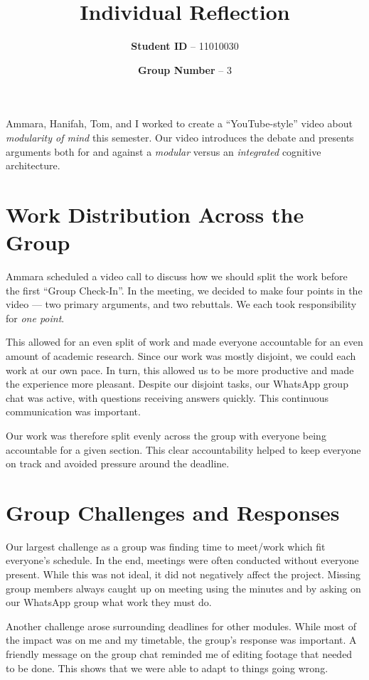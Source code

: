 \documentclass[paper=a4,fontsize=16pt]{article}
\title{Individual Reflection}
\author{\textbf{Student ID} -- 11010030}
\date{\textbf{Group Number} -- 3}
\begin{document}
\maketitle

Ammara, Hanifah, Tom, and I worked to create a
``YouTube-style'' video about \emph{modularity of mind} this semester. Our video
introduces the debate and presents arguments both for and against a
\textit{modular} versus an \textit{integrated} cognitive architecture.

\section{Work Distribution Across the Group}

Ammara scheduled a video call to discuss how we should split the work before
the first ``Group Check-In''. In the meeting, we decided to make four points
in the video --- two primary arguments, and two rebuttals. We each took
responsibility for \textit{one point}.

This allowed for an even split of work and made everyone accountable for an
even amount of academic research. Since our work was mostly disjoint, we
could each work at our own pace. In
turn, this allowed us to be more productive and made the experience more
pleasant. Despite our disjoint tasks, our WhatsApp group chat was active, with
questions receiving answers quickly. This continuous communication was important.

Our work was therefore split evenly across the group with everyone being
accountable for a given section. This clear accountability helped to keep
everyone on track  and avoided pressure around the deadline.

\section{Group Challenges and Responses}

Our largest challenge as a group was finding time to meet/work which fit
everyone's schedule. In the end, meetings were often conducted without everyone
present. While this was not ideal, it did not negatively
affect the project. Missing group members always caught up on meeting using the
minutes and by asking on our WhatsApp group what work they must do.

Another challenge arose surrounding deadlines for other modules.  While most
of the impact was on me and my timetable, the group's response was important.
A friendly message on the group chat reminded me of editing footage that
needed to be done. This shows that we were able to adapt to things going
wrong. 
\end{document}
